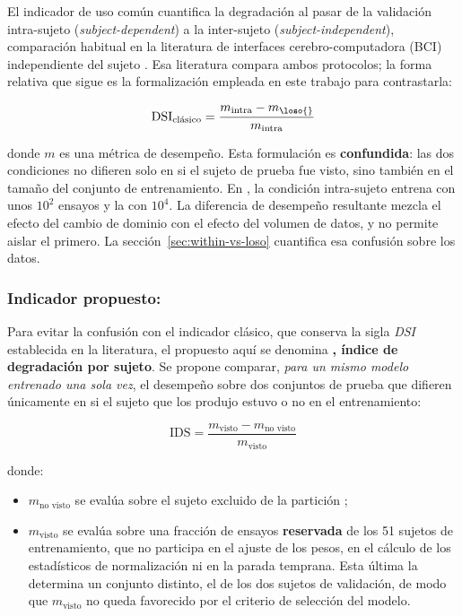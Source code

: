 El indicador de uso común cuantifica la degradación al pasar de la validación
intra-sujeto (\textit{subject-dependent}) a la inter-sujeto
(\textit{subject-independent}), comparación habitual en la literatura de interfaces cerebro-computadora
(BCI) independiente del sujeto \cite{kwon2020}. Esa literatura compara ambos protocolos; la
forma relativa que sigue es la formalización empleada en este trabajo para contrastarla:

\begin{equation}
\mathrm{DSI}_{\text{clásico}} =
  \frac{m_{\text{intra}} - m_{\text{\loso{}}}}{m_{\text{intra}}}
\label{eq:dsi-clasico}
\end{equation}

donde $m$ es una métrica de desempeño. Esta formulación es \textbf{confundida}:
las dos condiciones no difieren solo en si el sujeto de prueba fue visto, sino
también en el tamaño del conjunto de entrenamiento. En \openbmi{}, la condición
intra-sujeto entrena con unos $10^2$ ensayos y la \loso{} con $10^4$. La
diferencia de desempeño resultante mezcla el efecto del cambio de dominio con el
efecto del volumen de datos, y no permite aislar el primero. La
sección~\ref{sec:within-vs-loso} cuantifica esa confusión sobre los datos.

\subsubsection{Indicador propuesto: \texorpdfstring{\dsi{}}{IDS}}

Para evitar la confusión con el indicador clásico, que conserva la sigla \textit{DSI}
establecida en la literatura, el propuesto aquí se denomina \textbf{\dsi{}, índice de
degradación por sujeto}. Se propone comparar, \emph{para un mismo modelo entrenado una sola
vez}, el desempeño sobre dos conjuntos de prueba que difieren únicamente en si el sujeto
que los produjo estuvo o no en el entrenamiento:

\begin{equation}
\mathrm{IDS} = \frac{m_{\text{visto}} - m_{\text{no visto}}}{m_{\text{visto}}}
\label{eq:dsi}
\end{equation}

donde:

\begin{itemize}
  \item $m_{\text{no visto}}$ se evalúa sobre el sujeto excluido de la partición
        \loso{};
  \item $m_{\text{visto}}$ se evalúa sobre una fracción de ensayos
        \textbf{reservada} de los 51 sujetos de entrenamiento, que no participa
        en el ajuste de los pesos, en el cálculo de los estadísticos de
        normalización ni en la parada temprana. Esta última la determina un conjunto
        distinto, el de los dos sujetos de validación, de modo que $m_{\text{visto}}$
        no queda favorecido por el criterio de selección del modelo.
\end{itemize}


